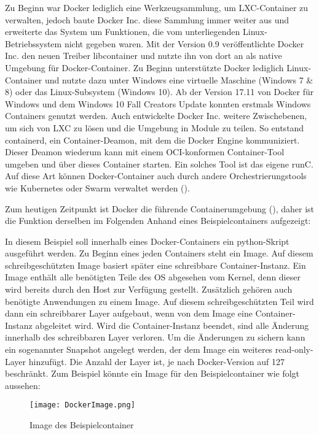 Zu Beginn war Docker lediglich eine Werkzeugsammlung, um LXC-Container zu verwalten, jedoch baute Docker Inc. diese Sammlung immer weiter aus und erweiterte das System um Funktionen, die vom unterliegenden Linux-Betriebssystem nicht gegeben waren. Mit der Version 0.9 veröffentlichte Docker Inc. den neuen Treiber libcontainer und nutzte ihn von dort an als native Umgebung für Docker-Container. \cite{dockerblog2} Zu Beginn unterstützte Docker lediglich Linux-Container und nutzte dazu unter Windows eine virtuelle Maschine (Windows 7 \& 8) oder das Linux-Subsystem (Windows 10). Ab der Version 17.11 von Docker für Windows und dem Windows 10 Fall Creators Update konnten erstmals Windows Containers genutzt werden. \cite{dockerblogwin} Auch entwickelte Docker Inc. weitere Zwischebenen, um sich von LXC zu lösen und die Umgebung in Module zu teilen. So entstand containerd, ein Container-Deamon, mit dem die Docker Engine kommuniziert. Dieser Deamon wiederum kann mit einem OCI-konformen Container-Tool umgeben und über dieses Container starten. Ein solches Tool ist das eigene runC. Auf diese Art können Docker-Container auch durch andere Orchestrierungstools wie Kubernetes oder Swarm verwaltet werden (\Vgl {}).\cite{Buch}

Zum heutigen Zeitpunkt ist Docker die führende Containerumgebung (\Vgl {}), daher ist die Funktion derselben im Folgenden Anhand eines Beispielcontainers aufgezeigt:

In diesem Beispiel soll innerhalb eines Docker-Containers ein python-Skript ausgeführt werden. Zu Beginn eines jeden Containers steht ein Image. Auf diesem schreibgeschützten Image basiert später eine schreibbare Container-Instanz. Ein Image enthält alle benötigten Teile des OS abgesehen vom Kernel, denn dieser wird bereits durch den Host zur Verfügung gestellt. Zusätzlich gehören auch benötigte Anwendungen zu einem Image. Auf diesem schreibgeschützten Teil wird dann ein schreibbarer Layer aufgebaut, wenn von dem Image eine Container-Instanz abgeleitet wird. Wird die Container-Instanz beendet, sind alle Änderung innerhalb des schreibbaren Layer verloren. Um die Änderungen zu sichern kann ein sogenannter Snapshot angelegt werden, der dem Image ein weiteres read-only-Layer hinzufügt. Die Anzahl der Layer ist, je nach Docker-Version auf 127 beschränkt. \cite{Buch, dockermanual} Zum Beispiel könnte ein Image für den Beispielcontainer wie folgt aussehen:

\begin{figure}[h]
    \vspace{-10pt}
    \begin{center}
        \texttt{[image: DockerImage.png]}
    \end{center}
    \caption[Image des Beispielcontainer ]{Image des Beispielcontainer}
    \label{fig:docker1}
    \vspace{-10pt}
    \end{figure}

